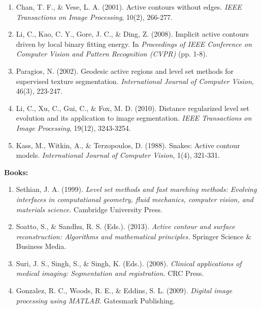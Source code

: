 \documentclass[]{report}
\begin{document}
\begin{enumerate}
    \item Chan, T. F., \& Vese, L. A. (2001). Active contours without edges. \textit{IEEE Transactions on Image Processing}, 10(2), 266-277.
    \item Li, C., Kao, C. Y., Gore, J. C., \& Ding, Z. (2008). Implicit active contours driven by local binary fitting energy. In \textit{Proceedings of IEEE Conference on Computer Vision and Pattern Recognition (CVPR)} (pp. 1-8).
    \item Paragios, N. (2002). Geodesic active regions and level set methods for supervised texture segmentation. \textit{International Journal of Computer Vision}, 46(3), 223-247.
    \item Li, C., Xu, C., Gui, C., \& Fox, M. D. (2010). Distance regularized level set evolution and its application to image segmentation. \textit{IEEE Transactions on Image Processing}, 19(12), 3243-3254.
    \item Kass, M., Witkin, A., \& Terzopoulos, D. (1988). Snakes: Active contour models. \textit{International Journal of Computer Vision}, 1(4), 321-331.
\end{enumerate}

\textbf{Books:}

\begin{enumerate}
    \item Sethian, J. A. (1999). \textit{Level set methods and fast marching methods: Evolving interfaces in computational geometry, fluid mechanics, computer vision, and materials science.} Cambridge University Press.
    \item Soatto, S., \& Sandhu, R. S. (Eds.). (2013). \textit{Active contour and surface reconstruction: Algorithms and mathematical principles.} Springer Science \& Business Media.
    \item Suri, J. S., Singh, S., \& Singh, K. (Eds.). (2008). \textit{Clinical applications of medical imaging: Segmentation and registration.} CRC Press.
    \item Gonzalez, R. C., Woods, R. E., \& Eddins, S. L. (2009). \textit{Digital image processing using MATLAB.} Gatesmark Publishing.
\end{enumerate}
\end{document}
